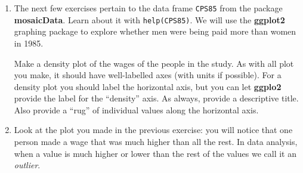 \documentclass[]{book}
\makeatletter
\newenvironment{Shaded}{\begin{snugshade}}{\end{snugshade}}
\newcommand{\KeywordTok}[1]{\textcolor[rgb]{0.13,0.29,0.53}{\textbf{#1}}}
\newcommand{\DataTypeTok}[1]{\textcolor[rgb]{0.13,0.29,0.53}{#1}}
\newcommand{\DecValTok}[1]{\textcolor[rgb]{0.00,0.00,0.81}{#1}}
\newcommand{\StringTok}[1]{\textcolor[rgb]{0.31,0.60,0.02}{#1}}
\newcommand{\OperatorTok}[1]{\textcolor[rgb]{0.81,0.36,0.00}{\textbf{#1}}}
\newcommand{\NormalTok}[1]{#1}
\providecommand{\tightlist}{%
  \setlength{\itemsep}{0pt}\setlength{\parskip}{0pt}}
\newenvironment{kframe}{%
\medskip{}
\setlength{\fboxsep}{.8em}
 \def\at@end@of@kframe{}%
 \ifinner\ifhmode%
  \def\at@end@of@kframe{\end{minipage}}%
  \begin{minipage}{\columnwidth}%
 \fi\fi%
 \def\FrameCommand##1{\hskip\@totalleftmargin \hskip-\fboxsep
 \colorbox{shadecolor}{##1}\hskip-\fboxsep
     \hskip-\linewidth \hskip-\@totalleftmargin \hskip\columnwidth}%
 \MakeFramed {\advance\hsize-\width
   \@totalleftmargin\z@ \linewidth\hsize
   \@setminipage}}%
 {\par\unskip\endMakeFramed%
 \at@end@of@kframe}
\renewenvironment{Shaded}{\begin{kframe}}{\end{kframe}}
\theoremstyle{definition}
\theoremstyle{definition}
\theoremstyle{definition}
\theoremstyle{remark}
\makeatother
\begin{document}
{\begin{enumerate}
  Your task is to write your own function called \texttt{dimSum()} that
  will sum either the rows or the columns of a given matrix. The
  function should have two parameters:

  \begin{itemize}
  \tightlist
  \item
    \texttt{mat}: the matrix to be summed.
  \item
    \texttt{dim}: the dimension to sum along, either rows or columns.
    The default value should be \texttt{c("rows",\ "columns")}, and you
    should use \protect\hyperlink{argument-matching}{argument-matching}
    so that the user doesn't have to spell out all of the possible
    arguments.
  \end{itemize}

  \textbf{You may NOT use \texttt{rowSums()} or \texttt{colSums()} in
  the code for your function.} A typical example of use should look like
  this:

\begin{Shaded}
\begin{Highlighting}[]
\NormalTok{myMatrix <-}\StringTok{ }\KeywordTok{matrix}\NormalTok{(}\DecValTok{1}\OperatorTok{:}\DecValTok{24}\NormalTok{, }\DataTypeTok{nrow =} \DecValTok{6}\NormalTok{)}
\KeywordTok{dimSum}\NormalTok{(myMatrix, }\StringTok{"c"}\NormalTok{)}
\end{Highlighting}
\end{Shaded}

\begin{verbatim}
## [1]  21  57  93 129
\end{verbatim}
\item
  The next few exercises pertain to the data frame \texttt{CPS85} from
  the package \textbf{mosaicData}. Learn about it with
  \texttt{help(CPS85)}. We will use the \textbf{ggplot2} graphing
  package to explore whether men were being paid more than women in
  1985.

  Make a density plot of the wages of the people in the study. As with
  all plot you make, it should have well-labelled axes (with units if
  possible). For a density plot you should label the horizontal axis,
  but you can let \textbf{ggplo2} provide the label for the ``density''
  axis. As always, provide a descriptive title. Also provide a ``rug''
  of individual values along the horizontal axis.
\item
  Look at the plot you made in the previous exercise: you will notice
  that one person made a wage that was much higher than all the rest. In
  data analysis, when a value is much higher or lower than the rest of
  the values we call it an \emph{outlier}.


\end{enumerate}}
\end{document}
